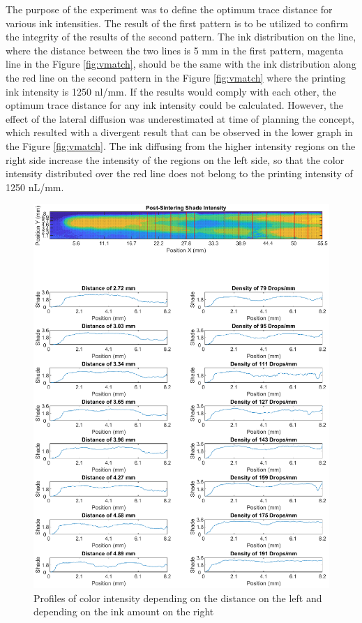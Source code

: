 \bigskip

The purpose of the experiment was to define the optimum trace distance for various ink intensities. The result of the first pattern is to be utilized to confirm the integrity of the results of the second pattern. The ink distribution on the line, where the distance between the two lines is 5 mm in the first pattern, magenta line in the Figure \ref{fig:vmatch}, should be the same with the ink distribution along the red line on the second pattern in the Figure \ref{fig:vmatch} where the printing ink intensity is 1250 nl/mm. If the results would comply with each other, the optimum trace distance for any ink intensity could be calculated. However, the effect of the lateral diffusion was underestimated at time of planning the concept, which resulted with a divergent result that can be observed in the lower graph in the Figure	\ref{fig:vmatch}. The ink diffusing from the higher intensity regions on the right side increase the intensity of the regions on the left side, so that the color intensity distributed over the red line does not belong to the printing intensity of 1250 nL/mm.

\bigskip

\begin{figure}[H]
	\centering
	\includegraphics[width=1\textwidth]{grafiken/vProfile.eps}
	\caption{Profiles of color intensity depending on the distance on the left and depending on the ink amount on the right}
	\label{fig:vProfile}
\end{figure} 

